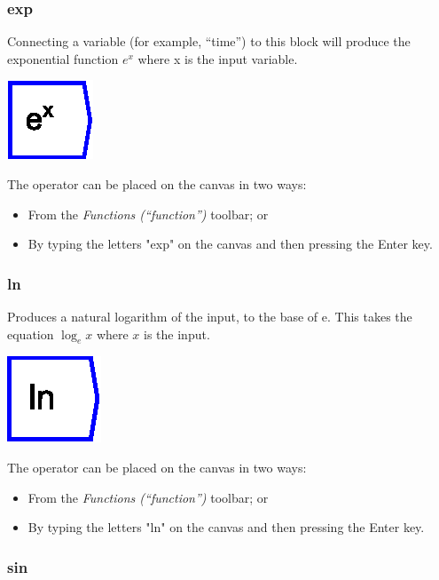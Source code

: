 \subsubsection{exp}

\label{Operation:exp} Connecting a variable (for example, ``time'')
to this block will produce the exponential function $e^{x}$ where
x is the input variable.

\includegraphics{images/Exponential}

The operator can be placed on the canvas in two ways:
\begin{itemize}
\item From the \emph{Functions (``function'')} toolbar; or 
\item By typing the letters "exp" on the canvas and then pressing the
Enter key. 
\end{itemize}

\subsubsection{ln}

\label{Operation:ln} Produces a natural logarithm of the input, to
the base of e. This takes the equation $\log_{e}x$ where $x$ is
the input.

\includegraphics{images/ln}

The operator can be placed on the canvas in two ways:
\begin{itemize}
\item From the \emph{Functions (``function'')} toolbar; or 
\item By typing the letters "ln" on the canvas and then pressing the Enter
key. 
\end{itemize}

\subsubsection{sin}

